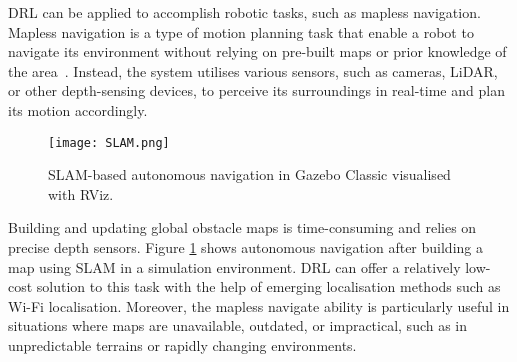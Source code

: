 DRL can be applied to accomplish robotic tasks, such as mapless navigation. Mapless navigation is a type of motion planning task that enable a robot to navigate its environment without relying on pre-built maps or prior knowledge of the area~\cite{ref:virtual2real-drl}. Instead, the system utilises various sensors, such as cameras, LiDAR, or other depth-sensing devices, to perceive its surroundings in real-time and plan its motion accordingly.

\begin{figure}[htbp]
\centering
\texttt{[image: SLAM.png]}
\caption{SLAM-based autonomous navigation in Gazebo Classic visualised with RViz.}
\label{fig:slam}
\end{figure}

Building and updating global obstacle maps is time-consuming and relies on precise depth sensors. Figure \ref{fig:slam} shows autonomous navigation after building a map using SLAM in a simulation environment. DRL can offer a relatively low-cost solution to this task with the help of emerging localisation methods such as Wi-Fi localisation. Moreover, the mapless navigate ability is particularly useful in situations where maps are unavailable, outdated, or impractical, such as in unpredictable terrains or rapidly changing environments.
